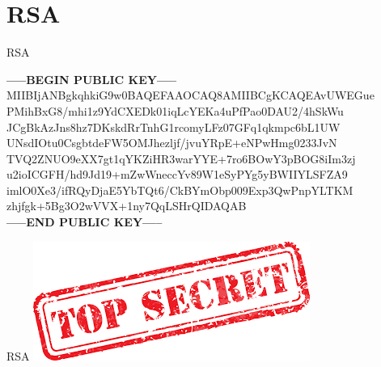 \documentclass{beamer}
\begin{document}
\section{RSA}


\begin{frame}{RSA}

\textbf{-----BEGIN PUBLIC KEY-----}\\
MIIBIjANBgkqhkiG9w0BAQEFAAOCAQ8AMIIBCgKCAQEAvUWEGue
PMihBxG8/mhi1z9YdCXEDk01iqLcYEKa4uPfPao0DAU2/4hSkWu
JCgBkAzJns8hz7DKskdRrTnhG1rcomyLFz07GFq1qkmpc6bL1UW
UNsdIOtu0CsgbtdeFW5OMJhezljf/jvuYRpE+eNPwHmg0233JvN
TVQ2ZNUO9eXX7gt1qYKZiHR3warYYE+7ro6BOwY3pBOG8iIm3zj
u2ioICGFH/hd9Jd19+mZwWneccYv89W1eSyPYg5yBWIIYLSFZA9
imlO0Xe3/ifRQyDjaE5YbTQt6/CkBYmObp009Exp3QwPnpYLTKM
zhjfgk+5Bg3O2wVVX+1ny7QqLSHrQIDAQAB\\
\textbf{-----END PUBLIC KEY-----}
\end{frame}

\begin{frame}{RSA}
	\includegraphics[width=\textwidth]{img/secret.png}
\end{frame}
\end{document}
